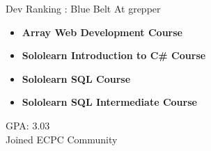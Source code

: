 


Dev Ranking : Blue Belt At grepper

\divider
{}

\divider


\divider




\medskip
{}
\begin{itemize}
\item \textbf{Array Web Development Course}
\item \textbf{Sololearn Introduction to C\# Course}
\item \textbf{Sololearn SQL Course}
\item \textbf{Sololearn SQL Intermediate Course}
\end{itemize}


GPA: 3.03\\
Joined ECPC Community
\divider

